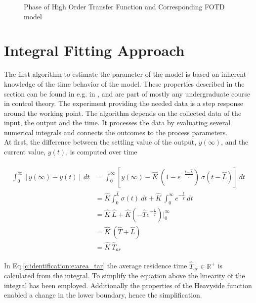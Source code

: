 \begin{figure}[H]\centering
  
  \caption{Phase of High Order Transfer Function and Corresponding FOTD model}
  \label{c:identification:f:phase_fotd}
\end{figure}


\section{Integral Fitting Approach}
\label{c:identification:s:area}

The first algorithm to estimate the parameter of the model is based on inherent knowledge of the time behavior of the model. These properties described in the section can be found in e.g. in \cite{Bi1999}, \cite{Fedele2009a} and are part of mostly any undergraduate course in control theory. The experiment providing the needed data is a step response around the working point. The algorithm depends on the collected data of the input, the output and the time. It processes the data by evaluating several numerical integrals and connects the outcomes to the process parameters.\\

At first, the difference between the settling value of the output, $y(\infty)$, and the current value, $y(t)$, is computed over time

\begin{align}
\begin{split}
\int_0^\infty \left[ y(\infty)-y(t) \right] ~dt &= \int_0^\infty \left[ y\left(\infty \right) - \hat{K} ~\left( 1 - e^{ -\frac{t- \hat{L}}{\hat{T}} } \right)~ \sigma(t-\hat{L}) \right] ~dt \\
&= \hat{K} \int_0^{\hat{L}} \sigma(t) ~dt + \hat{K} ~\int^{\infty}_0 e^{ -\frac{t}{ \hat{T} } } ~dt \\
&= \hat{K}~\hat{L} + \hat{K} \left( -\hat{T} e^{-\frac{t}{\hat{T}}}\right) \Bigg\rvert^\infty_0 \\
&= \hat{K}~\left(\hat{T}+\hat{L}\right) \\
&= \hat{K}~\hat{T}_{ar}
\end{split}
\label{c:identification:e:area_tar}
\end{align}

In Eq.\ref{c:identification:e:area_tar} the average residence time $\hat{T}_{ar} \in \mathbb{R}^+$ is calculated from the integral. To simplify the equation above the linearity of the integral has been employed. Additionally the properties of the Heavyside function enabled a change in the lower boundary, hence the simplification.\\

